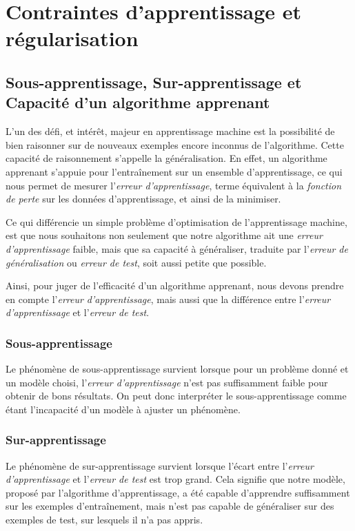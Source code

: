 \documentclass[a4paper, 10pt]{report}
\begin{document}
\section{Contraintes d'apprentissage et régularisation}
\subsection{Sous-apprentissage, Sur-apprentissage et Capacité d'un algorithme apprenant}
L'un des défi, et intérêt, majeur en apprentissage machine est la possibilité de bien raisonner sur de nouveaux exemples encore inconnus de l'algorithme. Cette capacité de raisonnement s'appelle la généralisation.
En effet, un algorithme apprenant s'appuie pour l'entraînement sur un ensemble d'apprentissage, ce qui nous permet de mesurer l'\emph{erreur d'apprentissage}, terme équivalent à la \emph{fonction de perte} sur les données d'apprentissage, et ainsi de la minimiser.

Ce qui différencie un simple problème d'optimisation de l'apprentissage machine, est que nous souhaitons non seulement que notre algorithme ait une \emph{erreur d’apprentissage} faible, mais que sa capacité à généraliser, traduite par l'\emph{erreur de généralisation} ou \emph{erreur de test}, soit aussi petite que possible.

Ainsi, pour juger de l'efficacité d'un algorithme apprenant, nous devons prendre en compte l'\emph{erreur d'apprentissage}, mais aussi que la différence entre l'\emph{erreur d'apprentissage} et l'\emph{erreur de test}.
\subsubsection{Sous-apprentissage}
Le phénomène de sous-apprentissage survient lorsque pour un problème donné et un modèle choisi, l'\emph{erreur d'apprentissage} n'est pas suffisamment faible pour obtenir de bons résultats.
On peut donc interpréter le sous-apprentissage comme étant l'incapacité d'un modèle à ajuster un phénomène.
\subsubsection{Sur-apprentissage}
Le phénomène de sur-apprentissage survient lorsque l'écart entre l'\emph{erreur d'apprentissage} et l'\emph{erreur de test} est trop grand. Cela signifie que notre modèle, proposé par l'algorithme d'apprentissage, a été capable d'apprendre suffisamment sur les exemples d'entraînement, mais n'est pas capable de généraliser sur des exemples de test, sur lesquels il n'a pas appris.
\end{document}
